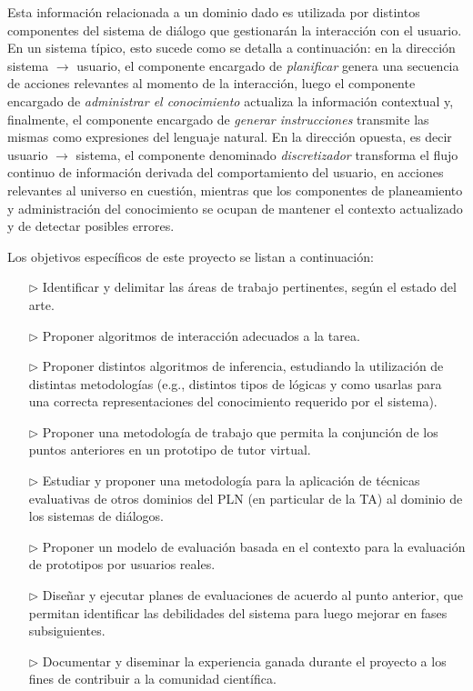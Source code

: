 Esta informaci\'on relacionada a un dominio dado es utilizada por distintos componentes del sistema de di\'alogo que
gestionar\'an la interacci\'on con el usuario. En un sistema t\'ipico, esto sucede como se detalla a continuaci\'on: en la direcci\'on sistema $\rightarrow$ usuario, el componente encargado de \textit{planificar} genera una secuencia de acciones relevantes al momento de la interacci\'on, luego el componente encargado de  \textit{administrar el conocimiento} actualiza la informaci\'on contextual y,  finalmente, el componente encargado de
\textit{generar instrucciones}  transmite las mismas como expresiones
del lenguaje natural.  En la direcci\'on opuesta, es decir usuario $\rightarrow$ sistema,  el componente denominado \textit{discretizador}
transforma el flujo continuo de informaci\'on derivada del comportamiento del usuario, en acciones relevantes al universo en cuesti\'on, mientras que
los componentes de planeamiento y administraci\'on del conocimiento se ocupan
de mantener el contexto actualizado y de detectar posibles errores.

Los objetivos espec\'ificos de este proyecto se listan a continuaci\'on:

\begin{itemize}
    \item[$\triangleright$] Identificar y delimitar las \'areas de trabajo pertinentes, seg\'un el estado del arte.\\[-2em]
    \item[$\triangleright$] Proponer  algoritmos de interacci\'on adecuados a la tarea.\\[-2em]
    \item[$\triangleright$] Proponer distintos algoritmos de inferencia, estudiando la utilizaci\'on de distintas metodolog\'ias (e.g., distintos tipos de l\'ogicas y como usarlas para una correcta representaciones del conoci\-mien\-to requerido por el sistema).\\[-2em]
    \item[$\triangleright$] Proponer una metodolog\'ia de trabajo que permita la conjunci\'on de los puntos anteriores en un prototipo de tutor virtual.\\[-2em]
    \item[$\triangleright$] Estudiar y proponer una metodolog\'ia para la aplicaci\'on de t\'ecnicas evaluativas de otros dominios del PLN (en particular de la TA) al dominio de los sistemas de di\'alogos.\\[-2em]
    \item[$\triangleright$] Proponer un modelo de evaluaci\'on basada en el contexto para la evaluaci\'on de prototipos por usuarios reales.\\[-2em]
    \item[$\triangleright$] Dise\~nar y ejecutar planes de evaluaciones de acuerdo al punto anterior, que permitan identificar las debilidades del sistema para luego mejorar en fases subsiguientes.\\[-2em]
    \item[$\triangleright$] Documentar y diseminar la experiencia ganada durante el proyecto a los fines de contribuir a la comunidad cient\'ifica.
\end{itemize}

